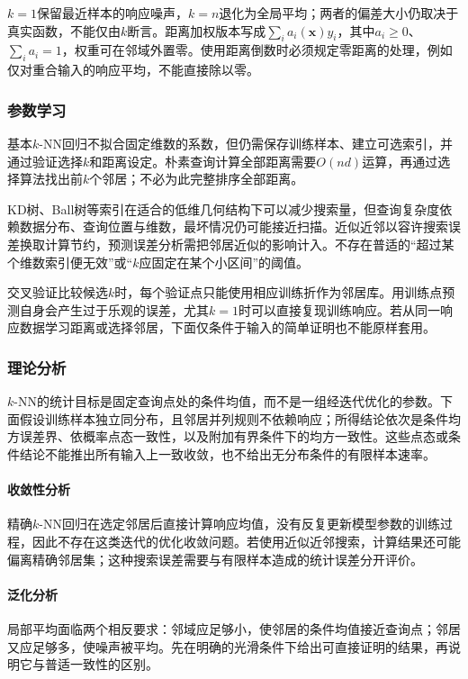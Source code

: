 $k=1$保留最近样本的响应噪声，$k=n$退化为全局平均；两者的偏差大小仍取决于真实函数，不能仅由$k$断言。距离加权版本写成$\sum_i a_i(\bm{x})y_i$，其中$a_i\geq0$、$\sum_i a_i=1$，权重可在邻域外置零。使用距离倒数时必须规定零距离的处理，例如仅对重合输入的响应平均，不能直接除以零。

\subsubsection{参数学习}

基本$k$-NN回归不拟合固定维数的系数，但仍需保存训练样本、建立可选索引，并通过验证选择$k$和距离设定。朴素查询计算全部距离需要$O(nd)$运算，再通过选择算法找出前$k$个邻居；不必为此完整排序全部距离。

KD树、Ball树等索引在适合的低维几何结构下可以减少搜索量，但查询复杂度依赖数据分布、查询位置与维数，最坏情况仍可能接近扫描。近似近邻以容许搜索误差换取计算节约，预测误差分析需把邻居近似的影响计入。不存在普适的“超过某个维数索引便无效”或“$k$应固定在某个小区间”的阈值。

交叉验证比较候选$k$时，每个验证点只能使用相应训练折作为邻居库。用训练点预测自身会产生过于乐观的误差，尤其$k=1$时可以直接复现训练响应。若从同一响应数据学习距离或选择邻居，下面仅条件于输入的简单证明也不能原样套用。

\subsubsection{理论分析}
\label{sec:regression-knn-theory}

$k$-NN的统计目标是固定查询点处的条件均值，而不是一组经迭代优化的参数。下面假设训练样本独立同分布，且邻居并列规则不依赖响应；所得结论依次是条件均方误差界、依概率点态一致性，以及附加有界条件下的均方一致性。这些点态或条件结论不能推出所有输入上一致收敛，也不给出无分布条件的有限样本速率。

\paragraph{收敛性分析}
精确$k$-NN回归在选定邻居后直接计算响应均值，没有反复更新模型参数的训练过程，因此不存在这类迭代的优化收敛问题。若使用近似近邻搜索，计算结果还可能偏离精确邻居集；这种搜索误差需要与有限样本造成的统计误差分开评价。

\paragraph{泛化分析}
局部平均面临两个相反要求：邻域应足够小，使邻居的条件均值接近查询点；邻居又应足够多，使噪声被平均。先在明确的光滑条件下给出可直接证明的结果，再说明它与普适一致性的区别。

